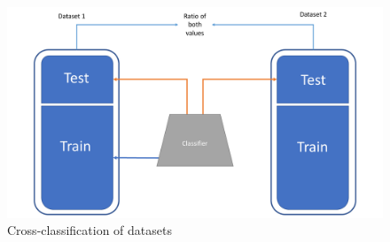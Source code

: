 \begin{figure}[tbph]
\centering
\caption{Cross-classification of datasets}\label{fig:cross_classi1} 
\includegraphics[scale=0.35]{figures/imagem1.pdf}
\end{figure}






